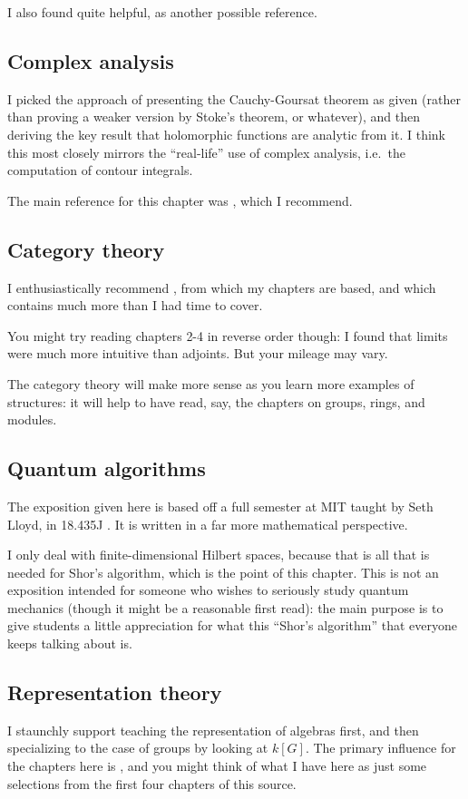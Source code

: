 I also found \cite{ref:lebesgue} quite helpful,
as another possible reference.

\subsection{Complex analysis}
I picked the approach of presenting the Cauchy-Goursat theorem as given
(rather than proving a weaker version by Stoke's theorem, or whatever),
and then deriving the key result that holomorphic functions are analytic
from it.
I think this most closely mirrors the ``real-life'' use of complex
analysis, i.e.\ the computation of contour integrals.

The main reference for this chapter was \cite{ref:dartmouth}, which I recommend.

\subsection{Category theory}
I enthusiastically recommend \cite{ref:msci},
from which my chapters are based,
and which contains much more than I had time to cover.

You might try reading chapters {2-4} in reverse order though:
I found that limits were much more intuitive than adjoints.
But your mileage may vary.

The category theory will make more sense as you learn
more examples of structures: it will help to have read,
say, the chapters on groups, rings, and modules.

\subsection{Quantum algorithms}
The exposition given here is based off a full semester
at MIT taught by Seth Lloyd, in 18.435J \cite{ref:18-435}.
It is written in a far more mathematical perspective.

I only deal with finite-dimensional Hilbert spaces,
because that is all that is needed for Shor's algorithm,
which is the point of this chapter.
This is not an exposition intended for someone who wishes to seriously
study quantum mechanics (though it might be a reasonable first read):
the main purpose is to give students a little appreciation for
what this ``Shor's algorithm'' that everyone keeps talking about is.

\subsection{Representation theory}
I staunchly support teaching the representation of algebras first,
and then specializing to the case of groups by looking at $k[G]$.
The primary influence for the chapters here is \cite{ref:etingof},
and you might think of what I have here as just some selections
from the first four chapters of this source.

